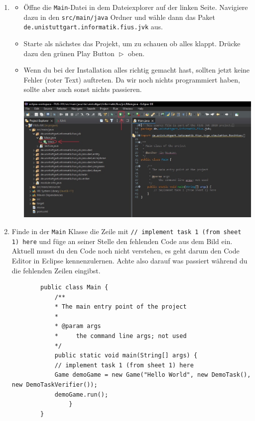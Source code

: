 \newpage

\begin{enumerate}
    \item
    \begin{itemize}
        \item Öffne die \texttt{Main}-Datei in dem Dateiexplorer auf der linken Seite.
            Navigiere dazu in den \texttt{src/main/java} Ordner und wähle dann das Paket \texttt{de.unistuttgart.informatik.fius.jvk} aus.
        \item Starte als nächstes das Projekt, um zu schauen ob alles klappt.
            Drücke dazu den grünen Play Button $\vartriangleright$ oben.
        \item Wenn du bei der Installation alles richtig gemacht hast, sollten jetzt keine Fehler (roter Text) auftreten.
            Da wir noch nichts programmiert haben, sollte aber auch sonst nichts passieren.
        \begin{center}
            \includegraphics[width=\linewidth]{./figures/ide.jpg}
        \end{center}
    \end{itemize}

    \item Finde in der \lstinline{Main} Klasse die Zeile mit \lstinline{// implement task 1 (from sheet 1) here} und füge an seiner Stelle den fehlenden Code aus dem Bild ein.
    Aktuell musst du den Code noch nicht verstehen, es geht darum den Code Editor in Eclipse kennenzulernen.
    Achte also darauf was passiert während du die fehlenden Zeilen eingibst.

    \begin{lstlisting}
        public class Main {
            /**
            * The main entry point of the project
            *
            * @param args
            *     the command line args; not used
            */
            public static void main(String[] args) {
            // implement task 1 (from sheet 1) here
            Game demoGame = new Game("Hello World", new DemoTask(), new DemoTaskVerifier());
            demoGame.run();
                }
        }   
    \end{lstlisting}


\end{enumerate}
